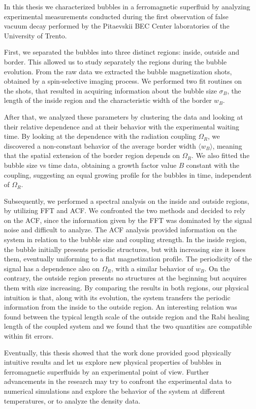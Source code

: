 In this thesis we characterized bubbles in a ferromagnetic superfluid by analyzing experimental measurements conducted during the first observation of false vacuum decay performed by the Pitaevskii BEC Center laboratories of the University of Trento. 

First, we separated the bubbles into three distinct regions: inside, outside and border. This allowed us to study separately the regions during the bubble evolution. From the raw data we extracted the bubble magnetization shots, obtained by a spin-selective imaging process. We performed two fit routines on the shots, that resulted in acquiring information about the bubble size $\sigma_B$, the length of the inside region and the characteristic width of the border $w_B$. 

After that, we analyzed these parameters by clustering the data and looking at their relative dependence and at their behavior with the experimental waiting time. By looking at the dependence with the radiation coupling $\Omega_R$, we discovered a non-constant behavior of the average border width $\langle w_B\rangle$, meaning that the spatial extension of the border region depends on $\Omega_R$. We also fitted the bubble size vs time data, obtaining a growth factor value $B$ constant with the coupling, suggesting an equal growing profile for the bubbles in time, independent of $\Omega_R$.

Subsequently, we performed a spectral analysis on the inside and outside regions, by utilizing FFT and ACF. We confronted the two methods and decided to rely on the ACF, since the information given by the FFT was dominated by the signal noise and difficult to analyze. The ACF analysis provided information on the system in relation to the bubble size and coupling strength. In the inside region, the bubble initially presents periodic structures, but with increasing size it loses them, eventually uniforming to a flat magnetization profile. The periodicity of the signal has a dependence also on $\Omega_R$, with a similar behavior of $w_B$. On the contrary, the outside region presents no structures at the beginning but acquires them with size increasing. By comparing the results in both regions, our physical intuition is that, along with its evolution, the system transfers the periodic information from the inside to the outside region. An interesting relation was found between the typical length scale of the outside region and the Rabi healing length of the coupled system and we found that the two quantities are compatible within fit errors.

Eventually, this thesis showed that the work done provided good physically intuitive results and let us explore new physical properties of bubbles in ferromagnetic superfluids by an experimental point of view. Further advancements in the research may try to confront the experimental data to numerical simulations and explore the behavior of the system at different temperatures, or to analyze the density data.
